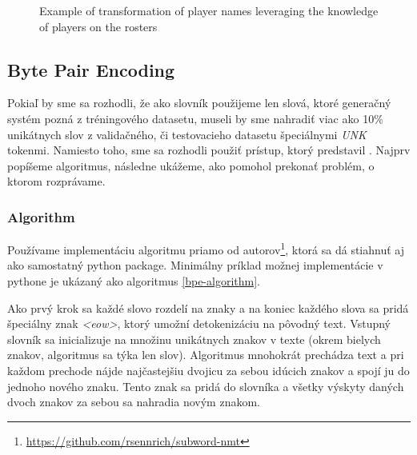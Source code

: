 \begin{figure}[!h]
    \centering
    \usetikzlibrary{shapes.multipart}
    \caption{Example of transformation of player names leveraging the knowledge of players on the rosters} \label{cmp_original_vs_mine}
\end{figure}

\subsection{Byte Pair Encoding} \label{bpeSection}

Pokiaľ by sme sa rozhodli, že ako slovník použijeme len slová, ktoré generačný systém pozná z tréningového datasetu, museli by sme nahradiť viac ako 10\% unikátnych slov z validačného, či testovacieho datasetu špeciálnymi \emph{UNK} tokenmi. Namiesto toho, sme sa rozhodli použiť prístup, ktorý predstavil \citep{sennrich2016}. Najprv popíšeme algoritmus, následne ukážeme, ako pomohol prekonať problém, o ktorom rozprávame.

\subsubsection{Algorithm}

Používame implementáciu algoritmu priamo od autorov\footnote{\url{https://github.com/rsennrich/subword-nmt}}, ktorá sa dá stiahnuť aj ako samostatný python package. Minimálny príklad možnej implementácie v pythone je ukázaný ako algoritmus \ref{bpe-algorithm}. 

Ako prvý krok sa každé slovo rozdelí na znaky a na koniec každého slova sa pridá špeciálny znak  \emph{\textless eow\textgreater}, ktorý umožní detokenizáciu na pôvodný text. Vstupný slovník sa inicializuje na množinu unikátnych znakov v texte (okrem bielych znakov, algoritmus sa týka len slov). Algoritmus mnohokrát prechádza text a pri každom prechode nájde najčastejšiu dvojicu za sebou idúcich znakov a spojí ju do jednoho nového znaku. Tento znak sa pridá do slovníka a všetky výskyty daných dvoch znakov za sebou sa nahradia novým znakom. 

